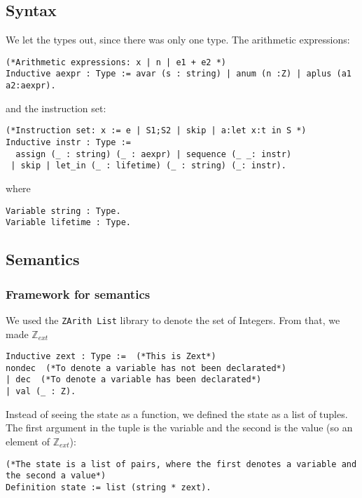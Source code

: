 \subsection{Syntax}
We let the types out, since there was only one type. The arithmetic expressions:
\begin{verbatim}
(*Arithmetic expressions: x | n | e1 + e2 *)
Inductive aexpr : Type := avar (s : string) | anum (n :Z) | aplus (a1 a2:aexpr).
\end{verbatim}
and the instruction set:
\begin{verbatim}
(*Instruction set: x := e | S1;S2 | skip | a:let x:t in S *)
Inductive instr : Type :=
  assign (_ : string) (_ : aexpr) | sequence (_ _: instr)
 | skip | let_in (_ : lifetime) (_ : string) (_: instr).
\end{verbatim}
where 
\begin{verbatim}
Variable string : Type.
Variable lifetime : Type.
\end{verbatim}

\subsection{Semantics}
\subsubsection{Framework for semantics}
We used the \verb|ZArith List| library to denote the set of Integers. From that, we made $\mathbb{Z}_{ext}$
\begin{verbatim}
Inductive zext : Type :=  (*This is Zext*)
nondec  (*To denote a variable has not been declarated*)
| dec  (*To denote a variable has been declarated*)
| val (_ : Z).
\end{verbatim}

Instead of seeing the state as a function, we defined the state as a list of tuples. The first argument in the tuple is the variable and the second is the value (so an element of $\mathbb{Z}_{ext}$):
\begin{verbatim}
(*The state is a list of pairs, where the first denotes a variable and the second a value*)
Definition state := list (string * zext).
\end{verbatim}

